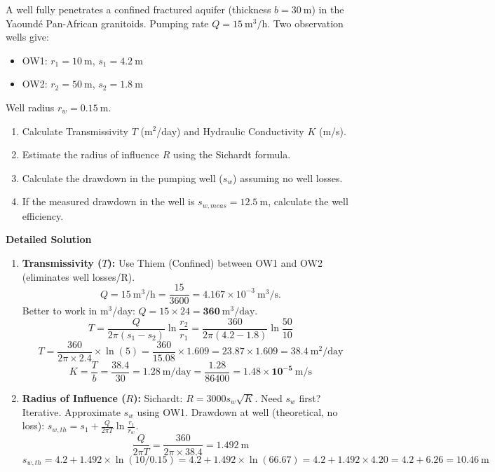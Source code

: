 \documentclass[11pt]{article}
\begin{document}
\begin{exoresolu}
A well fully penetrates a confined fractured aquifer (thickness $b=30\ \mathrm{m}$) in the Yaoundé Pan-African granitoids. Pumping rate $Q = 15\ \mathrm{m^3/h}$. Two observation wells give:
\begin{itemize}
    \item OW1: $r_1 = 10\ \mathrm{m}$, $s_1 = 4.2\ \mathrm{m}$
    \item OW2: $r_2 = 50\ \mathrm{m}$, $s_2 = 1.8\ \mathrm{m}$
\end{itemize}
Well radius $r_w = 0.15\ \mathrm{m}$.
\begin{enumerate}
    \item Calculate Transmissivity $T$ (m$^2$/day) and Hydraulic Conductivity $K$ (m/s).
    \item Estimate the radius of influence $R$ using the Sichardt formula.
    \item Calculate the drawdown in the pumping well ($s_w$) assuming no well losses.
    \item If the measured drawdown in the well is $s_{w,meas} = 12.5\ \mathrm{m}$, calculate the well efficiency.
\end{enumerate}
\tcblower
\textbf{Detailed Solution}
\begin{enumerate}
    \item \textbf{Transmissivity ($T$):} Use Thiem (Confined) between OW1 and OW2 (eliminates well losses/R).
    \[
    Q = 15\ \mathrm{m^3/h} = \frac{15}{3600} = 4.167 \times 10^{-3}\ \mathrm{m^3/s}.
    \]
    Better to work in m$^3$/day: $Q = 15 \times 24 = \mathbf{360\ \mathrm{m^3/day}}$.
    \[ T = \frac{Q}{2\pi (s_1 - s_2)} \ln\frac{r_2}{r_1} = \frac{360}{2\pi (4.2 - 1.8)} \ln\frac{50}{10} \]
    \[ T = \frac{360}{2\pi \times 2.4} \times \ln(5) = \frac{360}{15.08} \times 1.609 = 23.87 \times 1.609 = \mathbf{38.4\ \mathrm{m^2/day}} \]
    \[ K = \frac{T}{b} = \frac{38.4}{30} = 1.28\ \mathrm{m/day} = \frac{1.28}{86400} = \mathbf{1.48 \times 10^{-5}\ \mathrm{m/s}} \]
    \item \textbf{Radius of Influence ($R$):} Sichardt: $R = 3000 s_w \sqrt{K}$. Need $s_w$ first? Iterative. Approximate $s_w$ using OW1.
    Drawdown at well (theoretical, no loss): $s_{w,th} = s_1 + \frac{Q}{2\pi T} \ln\frac{r_1}{r_w}$.
    \[ \frac{Q}{2\pi T} = \frac{360}{2\pi \times 38.4} = 1.492\ \mathrm{m} \]
    \[ s_{w,th} = 4.2 + 1.492 \times \ln(10/0.15) = 4.2 + 1.492 \times \ln(66.67) = 4.2 + 1.492 \times 4.20 = 4.2 + 6.26 = 10.46\ \mathrm{m} \]

\end{enumerate}
\end{exoresolu}
\end{document}
